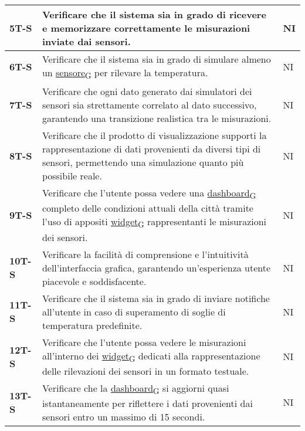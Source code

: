 \begin{longtable}{|>{\raggedright\arraybackslash}m{}|>{\raggedright\arraybackslash}m{}|>{\raggedright\arraybackslash}m{}|}
	\hline
	\textbf{5T-S}   & Verificare che il sistema sia in grado di ricevere e memorizzare correttamente le misurazioni inviate dai sensori.                                                                 & NI             \\
	\hline
	\textbf{6T-S}   & Verificare che il sistema sia in grado di simulare almeno un \href{https://7last.github.io/docs/rtb/documentazione-interna/glossario\#sensore}{sensore\textsubscript{G}} per rilevare la temperatura.                                                                                  & NI             \\
	\hline
	\textbf{7T-S}   & Verificare che ogni dato generato dai simulatori dei sensori sia strettamente correlato al dato successivo, garantendo una transizione realistica tra le misurazioni.              & NI             \\
	\hline
	\textbf{8T-S}   & Verificare che il prodotto di visualizzazione supporti la rappresentazione di dati provenienti da diversi tipi di sensori, permettendo una simulazione quanto più possibile reale. & NI             \\
	\hline
	\textbf{9T-S}   & Verificare che l'utente possa vedere una \href{https://7last.github.io/docs/rtb/documentazione-interna/glossario\#dashboard}{dashboard\textsubscript{G}} completo delle condizioni attuali della città tramite l'uso di appositi \href{https://7last.github.io/docs/rtb/documentazione-interna/glossario\#widget}{widget\textsubscript{G}} rappresentanti le misurazioni dei sensori.       & NI             \\
	\hline
	\textbf{10T-S}  & Verificare la facilità di comprensione e l'intuitività dell'interfaccia grafica, garantendo un'esperienza utente piacevole e soddisfacente.                                        & NI             \\
	\hline
	\textbf{11T-S}  & Verificare che il sistema sia in grado di inviare notifiche all'utente in caso di superamento di soglie di temperatura predefinite.                                                & NI             \\
	\hline
	\textbf{12T-S}  & Verificare che l’utente possa vedere le misurazioni all’interno dei \href{https://7last.github.io/docs/rtb/documentazione-interna/glossario\#widget}{widget\textsubscript{G}} dedicati alla rappresentazione delle rilevazioni dei sensori in un formato testuale.                    & NI             \\
	\hline
	\textbf{13T-S}  & Verificare che la \href{https://7last.github.io/docs/rtb/documentazione-interna/glossario\#dashboard}{dashboard\textsubscript{G}} si aggiorni quasi istantaneamente per riflettere i dati provenienti dai sensori entro un massimo di 15 secondi.                                        & NI             \\

\end{longtable}
